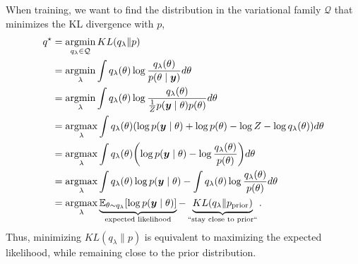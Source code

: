 When training, we want to find the distribution in the variational family
$\mathcal{Q}$ that minimizes the KL divergence with $p$,
\begin{align*}
  q^\star &= \argmin_{q_\lambda\in\mathcal{Q}} KL(q_\lambda \| p) \\
  &= \argmin_\lambda \int q_\lambda(\theta) \log \frac{q_\lambda(\theta)}{p(\theta\mid\vec{y})} d\theta \\
  &= \argmin_\lambda \int q_\lambda(\theta) \log \frac{q_\lambda(\theta)}{\frac{1}{Z}p(\vec{y}\mid\theta)p(\theta)} d\theta \\
  &= \argmax_\lambda \int q_\lambda(\theta) (\log p(\vec{y}\mid\theta) + \log p(\theta) - \log Z - \log q_\lambda(\theta)) d\theta \\
  &= \argmax_\lambda \int q_\lambda(\theta) \lft(\log p(\vec{y}\mid\theta) - \log \frac{q_\lambda(\theta)}{p(\theta)} \rgt) d\theta \\
  &= \argmax_\lambda \int q_\lambda(\theta) \log p(\vec{y}\mid\theta) - \int q_\lambda(\theta) \log \frac{q_\lambda(\theta)}{p(\theta)} d\theta \\
  &= \argmax_\lambda \underbrace{\E_{\theta \sim q_\lambda}[\log p(\vec{y}\mid\theta)]}_{\text{expected likelihood}} - \underbrace{KL(q_\lambda \| p_{\text{prior}})}_{\text{``stay close to prior``}}
.\end{align*}
Thus, minimizing $KL(q_\lambda \| p)$ is equivalent to maximizing the expected
likelihood, while remaining close to the prior distribution.

